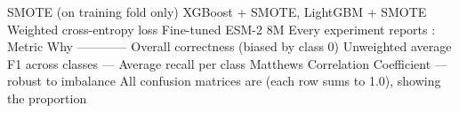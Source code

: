 {}\markdownRendererPipe{} SMOTE (on training fold only) \markdownRendererPipe{} XGBoost + SMOTE, LightGBM + SMOTE \markdownRendererPipe{}\markdownRendererSoftLineBreak
{}\markdownRendererPipe{} Weighted cross-entropy loss \markdownRendererPipe{} Fine-tuned ESM-2 8M \markdownRendererPipe{}\markdownRendererInterblockSeparator
{}
\markdownRendererSectionEnd \markdownRendererSectionBegin
{}\markdownRendererInterblockSeparator
{}Every experiment reports :\markdownRendererParagraphSeparator
{}\markdownRendererPipe{} Metric \markdownRendererPipe{} Why \markdownRendererPipe{}\markdownRendererSoftLineBreak
{}\markdownRendererPipe{}--------\markdownRendererPipe{}-----\markdownRendererPipe{}\markdownRendererSoftLineBreak
{}\markdownRendererPipe{}  \markdownRendererPipe{} Overall correctness (biased by class 0) \markdownRendererPipe{}\markdownRendererSoftLineBreak
{}\markdownRendererPipe{}  \markdownRendererPipe{} Unweighted average F1 across classes —  \markdownRendererPipe{}\markdownRendererSoftLineBreak
{}\markdownRendererPipe{}  \markdownRendererPipe{} Average recall per class \markdownRendererPipe{}\markdownRendererSoftLineBreak
{}\markdownRendererPipe{}  \markdownRendererPipe{} Matthews Correlation Coefficient — robust to imbalance \markdownRendererPipe{}\markdownRendererInterblockSeparator
{}
\markdownRendererSectionEnd \markdownRendererSectionBegin
{}\markdownRendererInterblockSeparator
{}\markdownRendererInterblockSeparator
{}\markdownRendererThematicBreak{}\markdownRendererInterblockSeparator
{}
\markdownRendererSectionEnd 
\markdownRendererSectionEnd \markdownRendererSectionBegin
{}\markdownRendererInterblockSeparator
{}\markdownRendererSectionBegin
{}\markdownRendererInterblockSeparator
{}\markdownRendererInterblockSeparator
{}
\markdownRendererSectionEnd \markdownRendererSectionBegin
{}\markdownRendererInterblockSeparator
{}All confusion matrices are  (each row sums to 1.0), showing the proportion\markdownRendererSoftLineBreak
